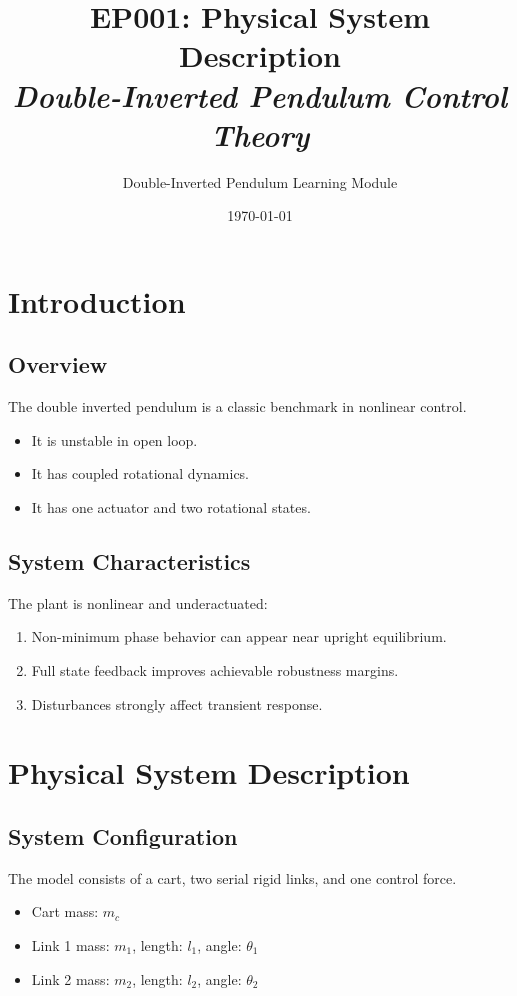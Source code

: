 \documentclass[11pt,a4paper]{article}
\title{\textbf{EP001: Physical System Description}\\\textit{Double-Inverted Pendulum Control Theory}}
\author{Double-Inverted Pendulum Learning Module}
\date{\today}
\begin{document}
\maketitle

\section{Introduction}

\subsection{Overview}
The double inverted pendulum is a classic benchmark in nonlinear control.
\begin{itemize}
    \item It is unstable in open loop.
    \item It has coupled rotational dynamics.
    \item It has one actuator and two rotational states.
\end{itemize}

\subsection{System Characteristics}
The plant is nonlinear and underactuated:
\begin{enumerate}
    \item Non-minimum phase behavior can appear near upright equilibrium.
    \item Full state feedback improves achievable robustness margins.
    \item Disturbances strongly affect transient response.
\end{enumerate}

\section{Physical System Description}

\subsection{System Configuration}
The model consists of a cart, two serial rigid links, and one control force.
\begin{itemize}
    \item Cart mass: $m_c$
    \item Link 1 mass: $m_1$, length: $l_1$, angle: $\theta_1$
    \item Link 2 mass: $m_2$, length: $l_2$, angle: $\theta_2$
\end{itemize}
\end{document}

